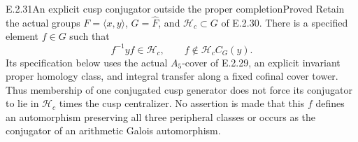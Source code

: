 \begin{result}{E.2.31}{An explicit cusp conjugator outside the proper completion}{Proved}
Retain the actual groups \(F=\langle x,y\rangle\),
\(G=\widehat F\), and \(\mathcal H_c\subset G\) of E.2.30.
There is a specified element \(f\in G\) such that
\[
 f^{-1}yf\in\mathcal H_c,
 \qquad
 f\notin\mathcal H_c C_G(y).
\tag{E.2.31a}
\]
Its specification below uses the actual \(A_5\)-cover of
E.2.29, an explicit invariant proper homology class, and
integral transfer along a fixed cofinal cover tower. Thus
membership of one conjugated cusp generator does not force
its conjugator to lie in \(\mathcal H_c\) times the cusp
centralizer. No assertion is made that this \(f\) defines an
automorphism preserving all three peripheral classes or
occurs as the conjugator of an arithmetic Galois automorphism.
\end{result}
